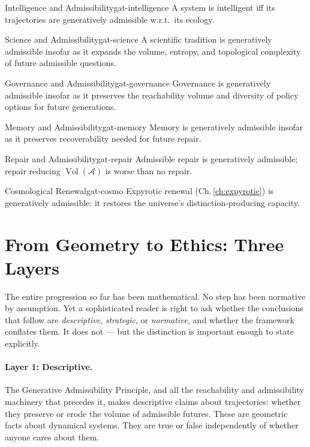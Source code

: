 \documentclass[12pt,twoside,openright]{book}
\newcommand{\adm}{\mathcal{A}}
\newcommand{\Vol}{\operatorname{Vol}}
\begin{document}
\begin{corollary}{Intelligence and Admissibility}{gat-intelligence}
  A system is intelligent iff its trajectories are
  generatively admissible w.r.t.\ its ecology.
\end{corollary}
\begin{corollary}{Science and Admissibility}{gat-science}
  A scientific tradition is generatively admissible insofar
  as it expands the volume, entropy, and topological
  complexity of future admissible questions.
\end{corollary}
\begin{corollary}{Governance and Admissibility}{gat-governance}
  Governance is generatively admissible insofar as it
  preserves the reachability volume and diversity of
  policy options for future generations.
\end{corollary}
\begin{corollary}{Memory and Admissibility}{gat-memory}
  Memory is generatively admissible insofar as it
  preserves recoverability needed for future repair.
\end{corollary}
\begin{corollary}{Repair and Admissibility}{gat-repair}
  Admissible repair is generatively admissible;
  repair reducing $\Vol(\adm)$ is worse than no repair.
\end{corollary}
\begin{corollary}{Cosmological Renewal}{gat-cosmo}
  Expyrotic renewal (Ch.\,\ref{ch:expyrotic}) is
  generatively admissible: it restores the universe's
  distinction-producing capacity.
\end{corollary}

\section{From Geometry to Ethics: Three Layers}
\label{sec:ch15-three-layers}

The entire progression so far has been mathematical. No step
has been normative by assumption. Yet a sophisticated reader
is right to ask whether the conclusions that follow are
\emph{descriptive}, \emph{strategic}, or \emph{normative},
and whether the framework conflates them. It does not --- but
the distinction is important enough to state explicitly.

\paragraph{Layer 1: Descriptive.}
The Generative Admissibility Principle, and all the
reachability and admissibility machinery that precedes it,
makes descriptive claims about trajectories: whether they
preserve or erode the volume of admissible futures. These
are geometric facts about dynamical systems. They are true
or false independently of whether anyone cares about them.
\end{document}

